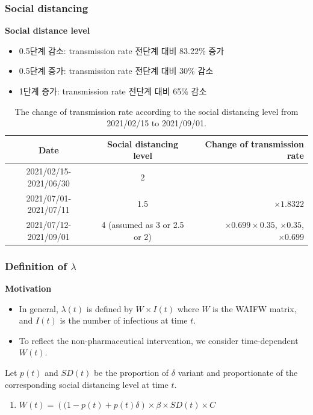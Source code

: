 \documentclass[aspectratio=169, 9pt, xcolor=dvipsnames]{beamer}
\begin{document}
	\begin{frame}\frametitle{Social distancing}
		\textbf{Social distance level}
		\begin{itemize}
			\item 0.5단계 감소: transmission rate 전단계 대비 83.22\% 증가
			\item 0.5단계 증가: transmission rate 전단계 대비 30\% 감소
			\item 1단계 증가: transmission rate 전단계 대비 65\% 감소
		\end{itemize}
	    \begin{table}
	    	\begin{tabular}{ccr}
	    		\toprule
	    		\textbf{Date} & \textbf{Social distancing level} & \textbf{Change of transmission rate} \\
	    		\midrule
	    		2021/02/15-2021/06/30 & 2 &  \\
	    		2021/07/01-2021/07/11 & 1.5 & $\times 1.8322$ \\
	    		2021/07/12-2021/09/01 & 4 (assumed as 3 or 2.5 or 2) & $\times 0.699 \times 0.35$, $\times 0.35$, $\times 0.699$ \\
	    		\bottomrule
	    	\end{tabular}
	    	\caption{The change of transmission rate according to the social distancing level from 2021/02/15 to 2021/09/01.}
	    \end{table}
	\end{frame}

	\begin{frame}\frametitle{Definition of $\lambda$}
		\textbf{Motivation}
	    \begin{itemize}
	    	\item In general, $\lambda(t)$ is defined by $W \times I(t)$ where $W$ is the WAIFW matrix, and $I(t)$ is the number of infectious at time $t$.
	    	\item To reflect the non-pharmaceutical intervention, we consider time-dependent $W(t)$.
	    \end{itemize}
	    \vspace{0.5cm}
	    Let $p(t)$ and $SD(t)$ be the proportion of $\delta$ variant and proportionate of the corresponding social distancing level at time $t$.
	    \begin{enumerate}
	    	\item $W(t) = \left((1 - p(t) + p(t) \delta\right) \times \beta \times SD(t) \times C$
	    \end{enumerate}
	\end{frame}
\end{document}
